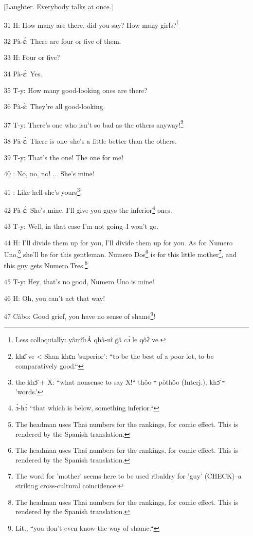 \begin{center}
[Laughter. Everybody talks at once.]
\end{center}

\leftskip=0pt
31 H: How many are there, did you say? How many girls?\footnote{Less colloquially: yâmîhÁ qhà-nî g̈â cɔ̀ le qôʔ ve.}

32 Pà-ɛ́: There are four or five of them.

33 H: Four or five?

34 Pà-ɛ́: Yes.

35 T-y: How many good-looking ones are there?

36 Pà-ɛ́: They're all good-looking.

37 T-y: There's one who isn't so bad as the others anyway!\footnote{khɛ̂ ve < Shan khɛn 'superior': ``to be the best of a poor lot, to be comparatively good.``}

38 Pà-ɛ́: There is one--she's a little better than the others.

39 T-y: That's the one! The one for me!

40       : No, no, no! ... She's mine!

41       : Like hell she's yours\footnote{the khɔ̂ + X: ``what nonsense to say X!`` thôo ꞊ pòthôo (Interj.), khɔ̂ ꞊ 'words.'}!

42 Pà-ɛ́: She's mine. I'll give you guys the inferior\footnote{ɔ̀-hɔ́ ``that which is below, something inferior.``} ones.

43 T-y: Well, in that case I'm not going--I won't go.

44 H: I'll divide them up for you, I'll divide them up for you. As for Numero Uno,\footnote{The headman uses Thai numbers for the rankings, for comic effect. This is rendered by the Spanish translation.}
she'll be for this gentleman. Numero Dos\footnote{The headman uses Thai numbers for the rankings, for comic effect. This is rendered by the Spanish translation.} is for this little mother\footnote{The word for 'mother' seems here to be used ribaldry for 'guy' (CHECK)--a striking cross-cultural coincidence.}, and
this guy gets Numero Tres.\footnote{The headman uses Thai numbers for the rankings, for comic effect. This is rendered by the Spanish translation.}

45 T-y: Hey, that's no good, Numero Uno is mine!

46 H: Oh, you can't act that way!

47 Càbo: Good grief, you have no sense of shame\footnote{Lit., ``you don't even know the way of shame.``}!

